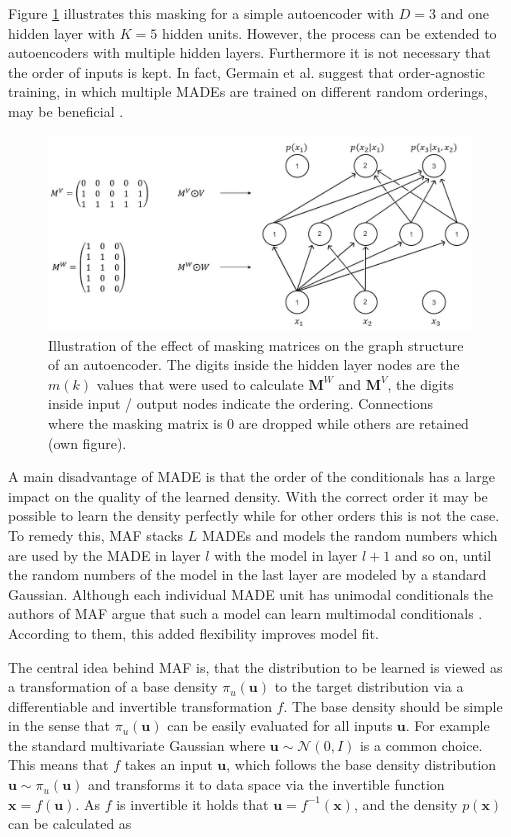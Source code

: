 \documentclass[11pt,titlepage,oneside,openany]{book}
\begin{document}
\noindent Figure \ref{fig:MADE} illustrates this masking for a simple autoencoder with $D=3$ and one hidden layer with $K=5$ hidden units. However, the process can be extended to autoencoders with multiple hidden layers. Furthermore it is not necessary that the order of inputs is kept. In fact, Germain et al. suggest that order-agnostic training, in which multiple MADEs are trained on different random orderings, may be beneficial \cite{germain_made_nodate}.

\begin{figure}[h]
	\centering
	\includegraphics[width=\linewidth]{MADE_vis.jpg}
	\caption[Illustration of MADE]{Illustration of the effect of masking matrices on the graph structure of an autoencoder. The digits inside the hidden layer nodes are the $m(k)$ values that were used to calculate $\mathbf{M}^W$ and $\mathbf{M}^V$, the digits inside input / output nodes indicate the ordering. Connections where the masking matrix is 0 are dropped while others are retained (own figure).}
	\label{fig:MADE}
\end{figure}

\noindent A main disadvantage of MADE is that the order of the conditionals has a large impact on the quality of the learned density. With the correct order it may be possible to learn the density perfectly while for other orders this is not the case. To remedy this, MAF stacks $L$ MADEs and models the random numbers which are used by the MADE in layer $l$ with the model in layer $l+1$ and so on, until the random numbers of the model in the last layer are modeled by a standard Gaussian. Although each individual MADE unit has unimodal conditionals the authors of MAF argue that such a model can learn multimodal conditionals \cite{papamakarios_masked_2017}. According to them, this added flexibility improves model fit.

The central idea behind MAF is, that the distribution to be learned is viewed as a transformation of a base density $\pi_{u} (\pmb{u})$ to the target distribution via a differentiable and invertible transformation $f$. The base density should be simple in the sense that $\pi_{u} (\pmb{u})$ can be easily evaluated for all inputs $\pmb{u}$. For example the standard multivariate Gaussian where $\pmb{u} \sim \mathcal{N}(0, I)$ is a common choice. This means that $f$ takes an input $\pmb{u}$, which follows the base density distribution $\pmb{u} \sim \pi_{u} (\pmb{u})$ and transforms it to data space via the invertible function $\pmb{x}=f(\pmb{u})$. As $f$ is invertible it holds that $\pmb{u} = f^{-1}(\pmb{x})$, and the density $p(\pmb{x})$ can be calculated as
\end{document}
